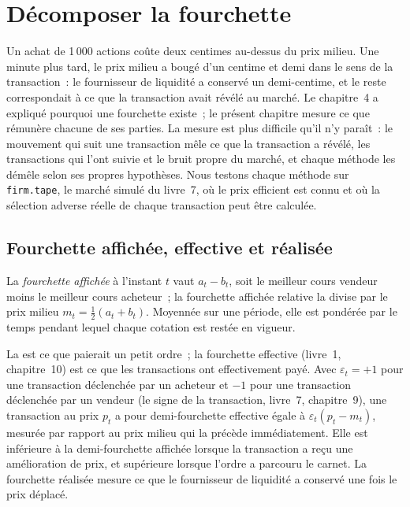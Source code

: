 \chapter{Décomposer la fourchette}\label{ch:mx:decomposing-the-spread}

Un achat de 1\,000 actions coûte deux centimes au-dessus du prix milieu. Une minute plus tard, le prix milieu a bougé d'un centime et demi dans le sens de la transaction~: le fournisseur de liquidité
a conservé un demi-centime, et le reste correspondait à ce que la transaction avait révélé au marché. Le chapitre~4 a expliqué pourquoi une fourchette existe~; le présent chapitre mesure ce que rémunère chacune
de ses parties. La mesure est plus difficile qu'il n'y paraît~: le mouvement qui suit une transaction mêle ce que la transaction a révélé, les transactions qui l'ont suivie et
le bruit propre du marché, et chaque méthode les démêle selon ses propres hypothèses. Nous testons chaque méthode sur \texttt{firm.tape}, le marché simulé
du livre~7, où le prix efficient est connu et où la sélection adverse réelle de chaque transaction peut être calculée.

\section{Fourchette affichée, effective et réalisée}

\begin{definition}\label{def:mx:decomposing-the-spread:quoted}
La \emph{fourchette affichée} à l'instant $t$ vaut $a_t-b_t$, soit le meilleur cours vendeur moins le meilleur cours acheteur~; la fourchette affichée relative la divise par le
prix milieu $m_t=\tfrac12(a_t+b_t)$. Moyennée sur une période, elle est pondérée par le temps pendant lequel chaque cotation est restée en vigueur.
\end{definition}

La  est ce que paierait un petit ordre~; la fourchette effective (livre~1, chapitre~10) est ce que les transactions ont effectivement payé. Avec $\varepsilon_t=+1$
pour une transaction déclenchée par un acheteur et $-1$ pour une transaction déclenchée par un vendeur (le signe de la transaction, livre~7, chapitre~9), une transaction au prix $p_t$ a pour demi-fourchette effective
égale à $\varepsilon_t(p_t-m_t)$, mesurée par rapport au prix milieu qui la précède immédiatement. Elle est inférieure à la demi-fourchette affichée lorsque la transaction a reçu
une amélioration de prix, et supérieure lorsque l'ordre a parcouru le carnet. La fourchette réalisée mesure ce que le fournisseur de liquidité a conservé une fois le prix déplacé.


